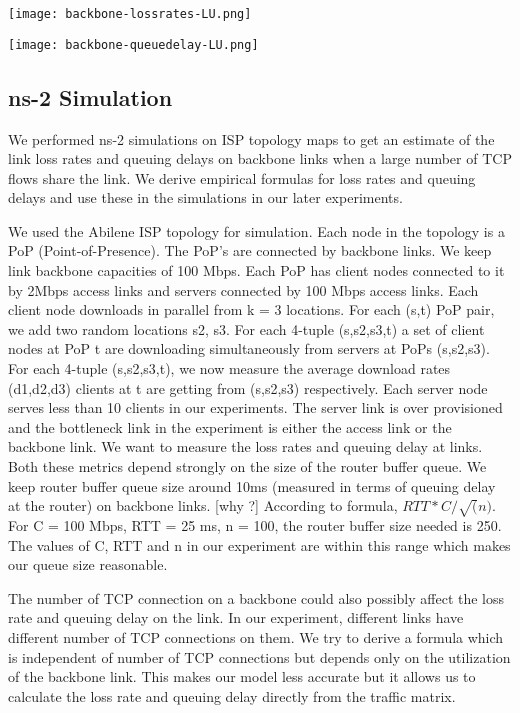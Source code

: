 \texttt{[image: backbone-lossrates-LU.png]}

\texttt{[image: backbone-queuedelay-LU.png]}

\subsection{ns-2 Simulation}

We performed ns-2 simulations on ISP topology maps to get an estimate of the link loss rates and queuing delays on backbone links when a large number of TCP flows share the link. We derive empirical formulas for loss rates and queuing delays and use these in the simulations in our later experiments.

We used the Abilene ISP topology for simulation. Each node in the topology is a PoP (Point-of-Presence). The PoP's are connected by backbone links. We keep link backbone capacities of 100 Mbps. Each PoP has client nodes connected to it by 2Mbps access links and servers connected by 100 Mbps access links.
Each client node downloads in parallel from k = 3 locations. For each (s,t) PoP pair, we add two random locations s2, s3. For each 4-tuple (s,s2,s3,t) a set of client nodes at PoP t are downloading simultaneously from servers at PoPs (s,s2,s3). For each 4-tuple (s,s2,s3,t), we now measure the average download rates (d1,d2,d3)  clients at t are getting from (s,s2,s3) respectively.
Each server node serves less than 10 clients in our experiments. The server link is over provisioned and the bottleneck link in the experiment is either the access link or the backbone link.
We want to measure the loss rates and queuing delay at links. Both these metrics depend strongly on the size of the router buffer queue. We keep router buffer queue size around 10ms (measured in terms of queuing delay at the router) on backbone links. [why ?] According to formula, $RTT*C/\sqrt(n)$. For C = 100 Mbps, RTT = 25 ms, n = 100, the router buffer size needed is 250. The values of C, RTT and n in our experiment are within this range which makes our queue size reasonable.

The number of TCP connection on a backbone could also possibly affect the loss rate and queuing delay on the link. In our experiment, different links have different number of TCP connections on them. We try to derive a formula which is independent of number of TCP connections but depends only on the utilization of the backbone link. This makes our model less accurate but it allows us to calculate the loss rate and queuing delay directly from the traffic matrix.

